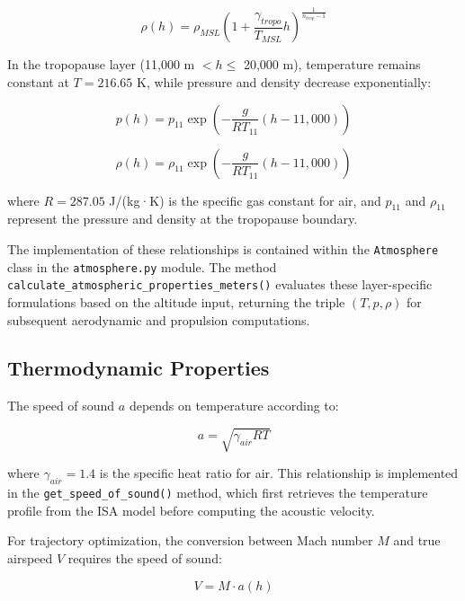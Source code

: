 \begin{equation}
\rho(h) = \rho_{MSL}\left(1 + \frac{\gamma_{tropo}}{T_{MSL}}h\right)^{\frac{1}{n_{trop}-1}}
\end{equation}

In the tropopause layer (11,000 m $< h \leq$ 20,000 m), temperature remains constant at $T = 216.65$ K, while pressure and density decrease exponentially:

\begin{equation}
p(h) = p_{11}\exp\left(-\frac{g}{RT_{11}}(h - 11,000)\right)
\end{equation}

\begin{equation}
\rho(h) = \rho_{11}\exp\left(-\frac{g}{RT_{11}}(h - 11,000)\right)
\end{equation}

where $R = 287.05$ J/(kg·K) is the specific gas constant for air, and $p_{11}$ and $\rho_{11}$ represent the pressure and density at the tropopause boundary.

The implementation of these relationships is contained within the \texttt{Atmosphere} class in the \texttt{atmosphere.py} module. The method \texttt{calculate\_atmospheric\_properties\_meters()} evaluates these layer-specific formulations based on the altitude input, returning the triple $(T, p, \rho)$ for subsequent aerodynamic and propulsion computations.

\subsection{Thermodynamic Properties}

The speed of sound $a$ depends on temperature according to:

\begin{equation}
a = \sqrt{\gamma_{air}RT}
\end{equation}

where $\gamma_{air} = 1.4$ is the specific heat ratio for air. This relationship is implemented in the \texttt{get\_speed\_of\_sound()} method, which first retrieves the temperature profile from the ISA model before computing the acoustic velocity.

For trajectory optimization, the conversion between Mach number $M$ and true airspeed $V$ requires the speed of sound:

\begin{equation}
V = M \cdot a(h)
\end{equation}

